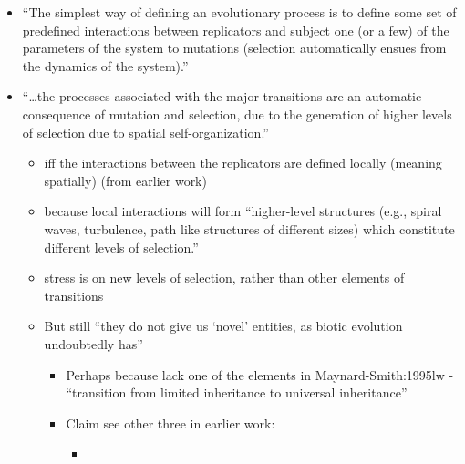 		\begin{itemize}
			\item
			
			``The simplest way of defining an evolutionary process is to define
			some set of predefined interactions between replicators and subject
			one (or a few) of the parameters of the system to mutations (selection
			automatically ensues from the dynamics of the system).''
			
			\item
			
			``\ldots{}the processes associated with the major transitions are an
			automatic consequence of mutation and selection, due to the generation
			of higher levels of selection due to spatial self-organization.''
			
			
			\begin{itemize}
				\item
				
				iff the interactions between the replicators are defined locally
				(meaning spatially) (from earlier work)
				
				\item
				
				because local interactions will form ``higher-level structures
				(e.g., spiral waves, turbulence, path like structures of different
				sizes) which constitute different levels of selection.''
				
				\item
				
				stress is on new levels of selection, rather than other elements of
				transitions
				
				\item
				
				But still ``they do not give us `novel' entities, as biotic
				evolution undoubtedly has''
				
				
				\begin{itemize}
					\item
					
					Perhaps because lack one of the elements in Maynard-Smith:1995lw -
					``transition from limited inheritance to universal inheritance''
					
					\item
					
					Claim see other three in earlier work:
					
					
					\begin{itemize}
						\item
						

\end{itemize}
\end{itemize}
\end{itemize}
\end{itemize}
